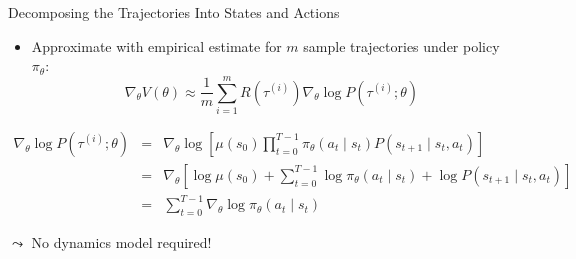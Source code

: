 \documentclass[aspectratio=169]{../latex_main/tntbeamer}  %
\begin{document}
\begin{frame}[c]{Decomposing the Trajectories Into States and Actions}
	
	\begin{itemize}
		\item Approximate with empirical estimate for $m$ sample trajectories under
		policy $\pi_\theta$:
		$$\nabla_\theta V(\theta) \approx \frac{1}{m} \sum_{i=1}^{m} R(\tau^{(i)}) \nabla_\theta \log P(\tau^{(i)}; \theta) $$
	\end{itemize}

\footnotesize
\begin{eqnarray*}
\nabla_\theta \log P(\tau^{(i)}; \theta) &=& \nabla_\theta \log \left[ \mu(s_0) \prod_{t=0}^{T-1} \pi_\theta(a_t \mid s_t) P(s_{t+1} \mid s_t, a_t) \right]\\
&=& \nabla_\theta \left[ \log \mu(s_0) + \sum_{t=0}^{T-1} \log \pi_\theta(a_t \mid s_t) + \log P(s_{t+1}\mid s_t, a_t) \right]\\
&=& \sum_{t=0}^{T-1} \nabla_\theta \log \pi_\theta (a_t \mid s_t)
\end{eqnarray*}
	
$\leadsto$ No dynamics model required!
	
\end{frame}
\end{document}
